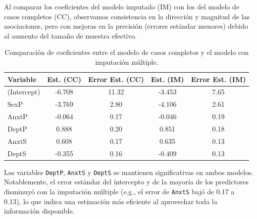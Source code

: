 \documentclass[paper=letter, fontsize=11pt, draft=false]{scrartcl}\usepackage[]{graphicx}\usepackage[]{xcolor}
\numberwithin{equation}{problemcounter} %
\numberwithin{figure}{problemcounter} %
\numberwithin{table}{problemcounter} %
\numberwithin{subsection}{problemcounter}
\begin{document}
Al comparar los coeficientes del modelo imputado (IM) con los del modelo de casos completos (CC), observamos consistencia en la dirección y magnitud de las asociaciones, pero con mejoras en la precisión (errores estándar menores) debido al aumento del tamaño de muestra efectivo.

\begin{table}[H]
\centering
\begin{tabular}{lcccc}
\toprule
Variable & Est. (CC) & Error Est. (CC) & Est. (IM) & Error Est. (IM) \\
\midrule
(Intercept) & -6.708 & 11.32 & -3.453 & 7.65 \\
SexP & -3.769 & 2.80 & -4.106 & 2.61 \\
AnxtP & -0.064 & 0.17 & -0.046 & 0.19 \\
DeptP & 0.888 & 0.20 & 0.851 & 0.18 \\
AnxtS & 0.608 & 0.17 & 0.635 & 0.13 \\
DeptS & -0.355 & 0.16 & -0.409 & 0.13 \\
\bottomrule
\end{tabular}
\caption{Comparación de coeficientes entre el modelo de casos completos y el modelo con imputación múltiple.}
\label{tab:comparison_coefficients}
\end{table}

Las variables \texttt{DeptP}, \texttt{AnxtS} y \texttt{DeptS} se mantienen significativas en ambos modelos. Notablemente, el error estándar del intercepto y de la mayoría de los predictores disminuyó con la imputación múltiple (e.g., el error de \texttt{AnxtS} bajó de 0.17 a 0.13), lo que indica una estimación más eficiente al aprovechar toda la información disponible.













































\end{document}
